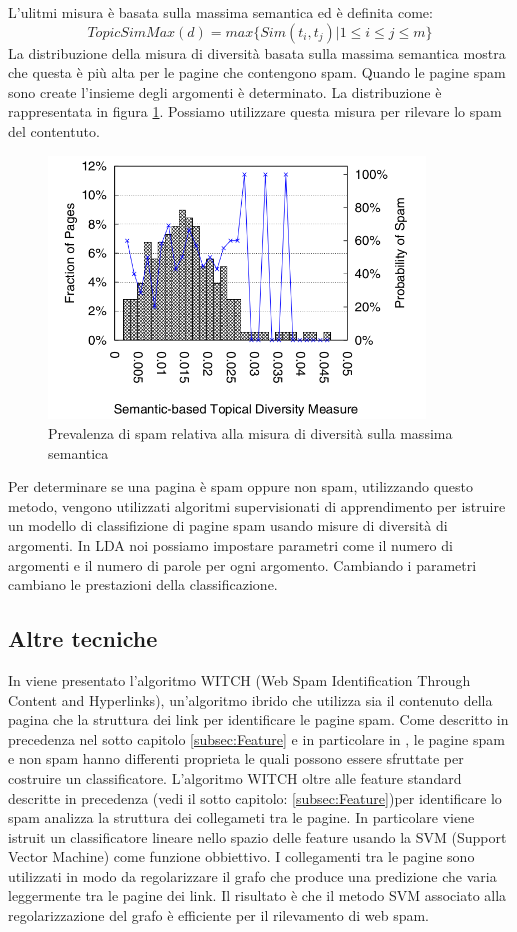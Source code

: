 L'ulitmi misura è basata sulla massima semantica ed è definita come:
\begin{equation}
TopicSimMax(d)= max\{Sim(t_i,t_j)|1 \leq i \leq j \leq m \}
\end{equation}
La distribuzione della misura di diversità basata sulla massima semantica mostra che questa è più alta per le pagine che contengono spam. Quando le pagine spam sono create l'insieme degli argomenti è determinato. La distribuzione è rappresentata in figura \ref{fig:zhou4}. Possiamo utilizzare questa misura per rilevare lo spam del contentuto.
\begin{figure}	
\centering
\includegraphics[width=10cm]{immagini/zhou/immagine3}
\caption{Prevalenza di spam relativa alla misura di diversità sulla massima semantica}
\label{fig:zhou4}
\end{figure}

Per determinare se una pagina è spam oppure non spam, utilizzando questo metodo, vengono utilizzati algoritmi supervisionati di apprendimento per istruire un modello di classifizione di pagine spam usando misure di diversità di argomenti. In LDA noi possiamo impostare parametri come il numero di argomenti e il numero di parole per ogni argomento. Cambiando i parametri cambiano le prestazioni della classificazione.

\subsection{Altre tecniche}
In \cite{Abernethy:2008:WSI:1451983.1451994} viene presentato  l'algoritmo WITCH (Web Spam Identification Through Content and Hyperlinks), un'algoritmo ibrido che utilizza sia il contenuto della pagina che la struttura dei link per identificare le pagine spam. Come descritto in precedenza nel sotto capitolo \ref{subsec:Feature} e in particolare in \cite{Ntoulas:2006:DSW:1135777.1135794}, le pagine spam e non spam hanno differenti proprieta le quali possono essere sfruttate per costruire un classificatore. L'algoritmo WITCH oltre alle feature standard descritte in precedenza (vedi il sotto capitolo: \ref{subsec:Feature})per identificare lo spam analizza la struttura dei collegameti tra le pagine. In particolare viene istruit un classificatore lineare nello spazio delle feature usando la SVM (Support Vector Machine) come funzione obbiettivo. I collegamenti tra le pagine sono utilizzati in modo da regolarizzare il grafo che produce una predizione che varia leggermente tra le pagine dei link. Il 
risultato è che il metodo SVM associato alla regolarizzazione del grafo è efficiente per il rilevamento di web spam. 

